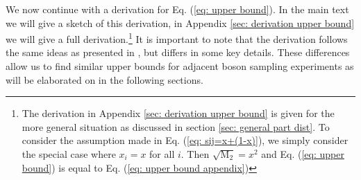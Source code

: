 \documentclass[10pt,aps,pra,twocolumn,superscriptaddress]{revtex4-2}
\begin{document}
We now continue with a derivation for Eq. (\ref{eq: upper bound}). In the main text we will give a sketch of this derivation, in Appendix \ref{sec: derivation upper bound} we will give a full derivation.\footnote{The derivation in Appendix \ref{sec: derivation upper bound} is given for the more general situation as discussed in section \ref{sec: general part dist}. To consider the assumption made in Eq. (\ref{eq: sij=x+(1-x)}), we simply consider the special case where $x_i=x$ for all $i$. Then $\sqrt{\mathrm{M}_2}=x^2$ and Eq. (\ref{eq: upper bound}) is equal to Eq. (\ref{eq: upper bound appendix}) } It is important to note that the derivation follows the same ideas as presented in \cite{renema2018efficient}, but differs in some key details. These differences allow us to find similar upper bounds for adjacent boson sampling experiments as will be elaborated on in the following sections. 
\end{document}
